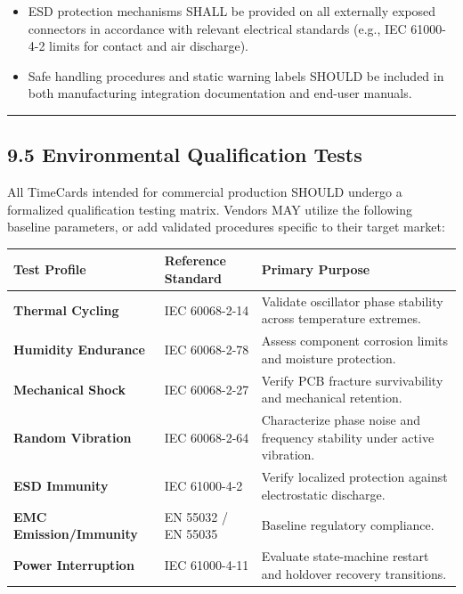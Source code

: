 \documentclass[
]{article}
\newcounter{none} %
\begin{document}
\begin{itemize}
\item
  ESD protection mechanisms SHALL be provided on all externally exposed
  connectors in accordance with relevant electrical standards (e.g., IEC
  61000-4-2 limits for contact and air discharge).\\
\item
  Safe handling procedures and static warning labels SHOULD be included
  in both manufacturing integration documentation and end-user manuals.
\end{itemize}

\begin{center}\rule{0.5\linewidth}{0.5pt}\end{center}

\subsection{9.5 Environmental Qualification
Tests}\label{environmental-qualification-tests}

All TimeCards intended for commercial production SHOULD undergo a
formalized qualification testing matrix. Vendors MAY utilize the
following baseline parameters, or add validated procedures specific to
their target market:

{\def\LTcaptype{none} %
\begin{longtable}[]{@{}
  >{\raggedright\arraybackslash}p{}
  >{\raggedright\arraybackslash}p{}
  >{\raggedright\arraybackslash}p{}@{}}
\toprule\noalign{}
Test Profile & Reference Standard & Primary Purpose \\
\midrule\noalign{}
\endhead
\bottomrule\noalign{}
\endlastfoot
\textbf{Thermal Cycling} & IEC 60068-2-14 & Validate oscillator phase
stability across temperature extremes. \\
\textbf{Humidity Endurance} & IEC 60068-2-78 & Assess component
corrosion limits and moisture protection. \\
\textbf{Mechanical Shock} & IEC 60068-2-27 & Verify PCB fracture
survivability and mechanical retention. \\
\textbf{Random Vibration} & IEC 60068-2-64 & Characterize phase noise
and frequency stability under active vibration. \\
\textbf{ESD Immunity} & IEC 61000-4-2 & Verify localized protection
against electrostatic discharge. \\
\textbf{EMC Emission/Immunity} & EN 55032 / EN 55035 & Baseline
regulatory compliance. \\
\textbf{Power Interruption} & IEC 61000-4-11 & Evaluate state-machine
restart and holdover recovery transitions. \\
\end{longtable}
}
\end{document}
